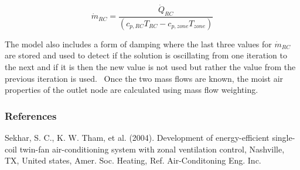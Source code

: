 \begin{equation}
{\dot m_{RC}} = \frac{{{{\dot Q}_{RC}}}}{{\left( {{c_{p,RC}}{T_{RC}} - {c_{p,zone}}{T_{zone}}} \right)}}
\end{equation}

The model also includes a form of damping where the last three values for \({\dot m_{RC}}\) are stored and used to detect if the solution is oscillating from one iteration to the next and if it is then the new value is not used but rather the value from the previous iteration is used.~ Once the two mass flows are known, the moist air properties of the outlet node are calculated using mass flow weighting.

\subsubsection{References}\label{references-6}

Sekhar, S. C., K. W. Tham, et al. (2004). Development of energy-efficient single-coil twin-fan air-conditioning system with zonal ventilation control, Nashville, TX, United states, Amer. Soc. Heating, Ref. Air-Conditoning Eng. Inc.
